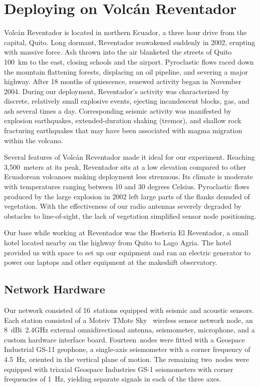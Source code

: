 \section{Deploying on Volc\'{a}n Reventador}

Volc\'{a}n Reventador is located in northern Ecuador, a three hour drive from
the capital, Quito.  Long dormant, Reventador reawakened suddenly in 2002,
erupting with massive force.  Ash thrown into the air blanketed the streets
of Quito 100~km to the east, closing schools and the airport.  Pyroclastic
flows raced down the mountain flattening forests, displacing an oil pipeline,
and severing a major highway.  After 18 months of quiescence, renewed
activity began in November 2004.  During our deployment, Reventador's
activity was characterized by discrete, relatively small explosive events,
ejecting incandescent blocks, gas, and ash several times a day.
Corresponding seismic activity was manifested by explosion earthquakes,
extended-duration shaking (tremor), and shallow rock fracturing earthquakes
that may have been associated with magma migration within the volcano.

Several features of Volc\'{a}n Reventador made it ideal for our
experiment.  Reaching 3,500~meters at its peak, Reventador sits at a
low elevation compared to other Ecuadorean volcanoes making deployment
less strenuous.  Its climate is moderate with temperatures ranging
between 10 and 30 degrees Celsius.  Pyroclastic flows produced by the
large explosion in 2002 left large parts of the flanks denuded of
vegetation.  With the effectiveness of our radio antennas severely
degraded by obstacles to line-of-sight, the lack of vegetation
simplified sensor node positioning.

Our base while working at Reventador was the Hosteria El Reventador, a small
hotel located nearby on the highway from Quito to Lago Agria.  The hotel
provided us with space to set up our equipment and ran an electric generator
to power our laptops and other equipment at the makeshift observatory.

\subsection{Network Hardware}

Our network consisted of 16~stations equipped with seismic and acoustic
sensors.  Each station consisted of a Moteiv TMote Sky~\cite{moteiv} wireless
sensor network node, an 8~dBi~2.4GHz external omnidirectional antenna,
seismometer, microphone, and a custom hardware interface board.
Fourteen~nodes were fitted with a Geospace Industrial GS-11 geophone, a
single-axis seismometer with a corner frequency of 4.5~Hz, oriented in the
vertical plane of motion.  The remaining two~nodes were equipped with
triaxial Geospace Industries GS-1 seismometers with corner frequencies of
1~Hz, yielding separate signals in each of the three axes.

